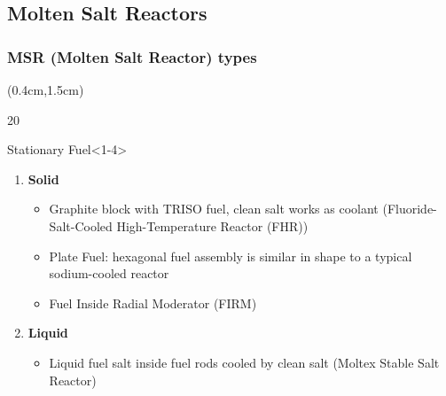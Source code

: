 \subsection{Molten Salt Reactors}


\begin{frame}
\frametitle{MSR (Molten Salt Reactor) types}
\begin{textblock*}{12cm}(0.4cm,1.5cm) %
\begin{overlayarea}{\linewidth}{20\baselineskip}
\begin{block}{Stationary Fuel}<1-4>
	\begin{enumerate}
		\item \textbf{Solid}
			\begin{itemize}
				\item Graphite block with TRISO fuel, clean salt works as 
				coolant (Fluoride-Salt-Cooled High-Temperature Reactor (FHR))
				\item Plate Fuel: hexagonal fuel assembly is similar in shape 
				to a typical sodium-cooled reactor
				\item Fuel Inside Radial Moderator (FIRM)
			\end{itemize}
		\item \textbf{Liquid}
			\begin{itemize}
				\item Liquid fuel salt inside fuel rods cooled by clean salt 
				(Moltex Stable Salt Reactor)
			\end{itemize}
	\end{enumerate}
\end{block}


\end{overlayarea}
\end{textblock*}
\end{frame}
